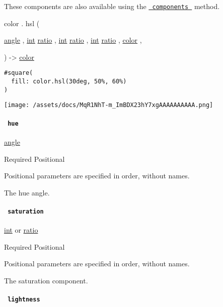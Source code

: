 These components are also available using the
\href{/docs/reference/visualize/color/\#definitions-components}{\texttt{\ components\ }}
method.

color { . } { hsl } (

{ \href{/docs/reference/layout/angle/}{angle} , } {
\href{/docs/reference/foundations/int/}{int}
\href{/docs/reference/layout/ratio/}{ratio} , } {
\href{/docs/reference/foundations/int/}{int}
\href{/docs/reference/layout/ratio/}{ratio} , } {
\href{/docs/reference/foundations/int/}{int}
\href{/docs/reference/layout/ratio/}{ratio} , } {
\href{/docs/reference/visualize/color/}{color} , }

) -\textgreater{} \href{/docs/reference/visualize/color/}{color}

\begin{verbatim}
#square(
  fill: color.hsl(30deg, 50%, 60%)
)
\end{verbatim}

\texttt{[image: /assets/docs/MqR1NhT-m\_ImBDX23hY7xgAAAAAAAAAA.png]}

\paragraph{\texorpdfstring{\texttt{\ hue\ }}{ hue }}\label{definitions-hsl-hue}

\href{/docs/reference/layout/angle/}{angle}

{Required} {{ Positional }}

\label{definitions-hsl-hue-positional-tooltip}
Positional parameters are specified in order, without names.

The hue angle.

\paragraph{\texorpdfstring{\texttt{\ saturation\ }}{ saturation }}\label{definitions-hsl-saturation}

\href{/docs/reference/foundations/int/}{int} {or}
\href{/docs/reference/layout/ratio/}{ratio}

{Required} {{ Positional }}

\label{definitions-hsl-saturation-positional-tooltip}
Positional parameters are specified in order, without names.

The saturation component.

\paragraph{\texorpdfstring{\texttt{\ lightness\ }}{ lightness }}\label{definitions-hsl-lightness}

